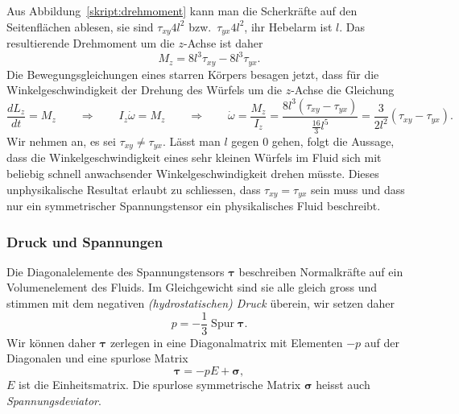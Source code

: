 Aus Abbildung~\ref{skript:drehmoment} kann man die Scherkräfte auf den
Seitenflächen ablesen, sie sind $\tau_{xy}4l^2$ bzw.~$\tau_{yx}4l^2$,
ihr Hebelarm ist $l$.
Das resultierende Drehmoment um die $z$-Achse ist daher
\[
M_z = 8l^3\tau_{xy} - 8l^3\tau_{yx}.
\]
Die Bewegungsgleichungen eines starren Körpers besagen jetzt, dass
für die Winkelgeschwindigkeit der Drehung des Würfels um die $z$-Achse
die Gleichung
\[
\frac{dL_z}{dt}
=
M_z
\qquad\Rightarrow\qquad
I_z\dot\omega
=
M_z
\qquad\Rightarrow\qquad
\dot\omega
=
\frac{M_z}{I_z}
=
\frac{8l^3(\tau_{xy}-\tau_{yx})}{\frac{16}{3}l^5}
=
\frac{3}{2l^2}(\tau_{xy}-\tau_{yx}).
\]
Wir nehmen an, es sei $\tau_{xy}\ne\tau_{yx}$.
Lässt man $l$ gegen $0$ gehen, folgt die Aussage, dass die
Winkelgeschwindigkeit eines sehr kleinen Würfels im Fluid sich mit beliebig
schnell anwachsender Winkelgeschwindigkeit drehen müsste.
Dieses unphysikalische Resultat erlaubt zu schliessen, dass
$\tau_{xy}=\tau_{yx}$ sein muss und dass nur ein
symmetrischer Spannungstensor ein physikalisches Fluid beschreibt.

\subsubsection{Druck und Spannungen}
Die Diagonalelemente des Spannungstensors $\bm{\tau}$ beschreiben
Normalkräfte auf ein Volumenelement des Fluids.
Im Gleichgewicht sind sie alle gleich gross und stimmen mit dem
negativen {\em (hydrostatischen) Druck} überein, wir setzen daher
\[
p=-\frac13\operatorname{Spur}\bm{\tau}.
\]
Wir können daher $\bm{\tau}$ zerlegen in eine Diagonalmatrix
mit Elementen $-p$ auf der Diagonalen und eine spurlose Matrix
\[
\bm{\tau} = -pE + \bm{\sigma},
\]
$E$ ist die Einheitsmatrix.
Die spurlose symmetrische Matrix $\bm{\sigma}$ heisst auch
{\em Spannungsdeviator}.

